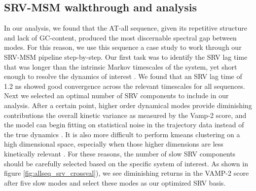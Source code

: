 \documentclass[journal=jpcbfk,manuscript=article]{achemso}
\begin{document}
\subsection{SRV-MSM walkthrough and analysis}
In our analysis, we found that the AT-all sequence, given its repetitive structure and lack of GC-content, produced the most discernable spectral gap between modes. For this reason, we use this sequence a case study to work through our SRV-MSM pipeline step-by-step. Our first task was to identify the SRV lag time that was longer than the intrinsic Markov timescales of the system, yet short enough to resolve the dynamics of interest \citep{Phys2018MarkovValidation}. We found that an SRV lag time of 1.2 ns showed good convergence across the relevant timescales for all sequences. Next we selected an optimal number of SRV components to include in our analysis. After a certain point, higher order dynamical modes provide diminishing contributions the overall kinetic variance as measured by the Vamp-2 score, and the model can begin fitting on statistical noise in the trajectory data instead of the true dynamics \citep{McGibbon2015VariationalKinetics}. It is also more difficult to perform kmeans clustering on a high dimensional space, especially when those higher dimensions are less kinetically relevant \citep{Pande2010EverythingAsk}. For these reasons, the number of slow SRV components should be carefully selected based on the specific system of interest. As shown in figure \ref{fig:allseq_srv_crossval}), we see diminishing returns in the VAMP-2 score after five slow modes and select these modes as our optimized SRV basis.
\end{document}

